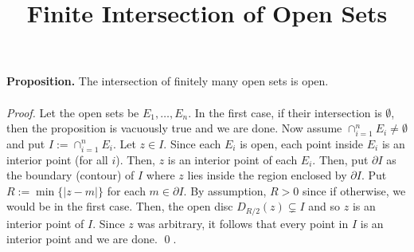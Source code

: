 


\title{Finite Intersection of Open Sets}
\author{}
\date{}
\maketitle

\textbf{Proposition. } The intersection of finitely many open sets is open. \\
\\
\textit{Proof. } Let the open sets be $E_1,\dots,E_n$. In the first case, if their intersection is $\emptyset$, then the proposition is vacuously true and we are done. Now assume $\cap_{i=1}^n E_i \neq \emptyset$ and put $I := \cap_{i=1}^n E_i$. Let $z \in I$. Since each $E_i$ is open, each point inside $E_i$ is an interior point (for all $i$). Then, $z$ is an interior point of each $E_i$. Then, put $\partial I$ as the boundary (contour) of $I$ where $z$ lies inside the region enclosed by $\partial I$. Put $R := \min\{|z-m|\}$ for each $m \in \partial I$. By assumption, $R>0$ since if otherwise, we would be in the first case. Then, the open disc $D_{R/2}(z) \subsetneq I$ and so $z$ is an interior point of $I$. Since $z$ was arbitrary, it follows that every point in $I$ is an interior point and we are done. \qed. 
